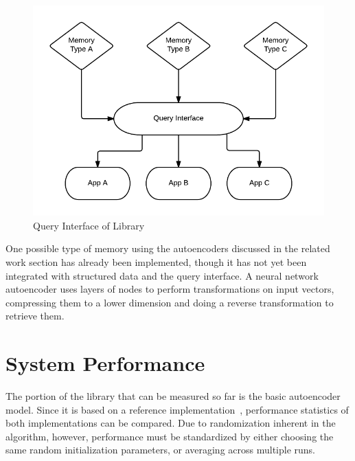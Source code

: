 \documentclass{sig-alternate}
\begin{document}
\begin{figure}[h]
	\begin{center}
		\includegraphics[width=1\linewidth]{queryint}
	\end{center}
	\vspace{-12pt}
	\caption{Query Interface of Library}
	\label{fig:queryint}
\end{figure}

One possible type of memory using the autoencoders discussed in the related work
section has already been implemented, though it has not yet been integrated with
structured data and the query interface. A neural network autoencoder uses layers of nodes to perform 
transformations on input vectors, compressing them to a lower dimension and doing a reverse 
transformation to retrieve them. 


\section{System Performance}
\label{sec:sysperformance}

The portion of the library that can be measured so far is the basic autoencoder model. 
Since it is based on a reference implementation~\cite{denoise}, performance statistics of both
implementations can be compared. Due to randomization inherent in the algorithm, however, 
performance must be standardized by either choosing the same random initialization parameters, or 
averaging across multiple runs. 
\end{document}
